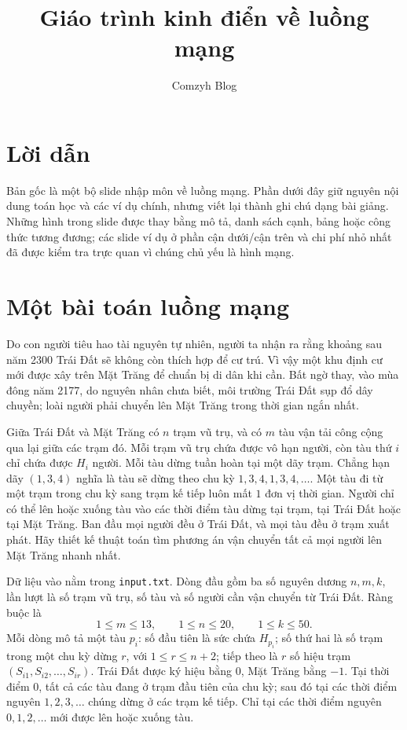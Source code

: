 \documentclass[11pt]{article}
\title{Giáo trình kinh điển về luồng mạng}
\author{Comzyh Blog}
\date{}
\begin{document}
\maketitle


\section*{Lời dẫn}

Bản gốc là một bộ slide nhập môn về luồng mạng. Phần dưới đây giữ nguyên nội
dung toán học và các ví dụ chính, nhưng viết lại thành ghi chú dạng bài giảng.
Những hình trong slide được thay bằng mô tả, danh sách cạnh, bảng hoặc công
thức tương đương; các slide ví dụ ở phần cận dưới/cận trên và chi phí nhỏ
nhất đã được kiểm tra trực quan vì chúng chủ yếu là hình mạng.

\section{Một bài toán luồng mạng}

Do con người tiêu hao tài nguyên tự nhiên, người ta nhận ra rằng khoảng sau năm
2300 Trái Đất sẽ không còn thích hợp để cư trú. Vì vậy một khu định cư mới được
xây trên Mặt Trăng để chuẩn bị di dân khi cần. Bất ngờ thay, vào mùa đông năm
2177, do nguyên nhân chưa biết, môi trường Trái Đất sụp đổ dây chuyền; loài
người phải chuyển lên Mặt Trăng trong thời gian ngắn nhất.

Giữa Trái Đất và Mặt Trăng có $n$ trạm vũ trụ, và có $m$ tàu vận tải công cộng
qua lại giữa các trạm đó. Mỗi trạm vũ trụ chứa được vô hạn người, còn tàu thứ
$i$ chỉ chứa được $H_i$ người. Mỗi tàu dừng tuần hoàn tại một dãy trạm. Chẳng
hạn dãy $(1,3,4)$ nghĩa là tàu sẽ dừng theo chu kỳ
$1,3,4,1,3,4,\ldots$. Một tàu đi từ một trạm trong chu kỳ sang trạm kế tiếp
luôn mất $1$ đơn vị thời gian. Người chỉ có thể lên hoặc xuống tàu vào các thời
điểm tàu dừng tại trạm, tại Trái Đất hoặc tại Mặt Trăng. Ban đầu mọi người đều
ở Trái Đất, và mọi tàu đều ở trạm xuất phát. Hãy thiết kế thuật toán tìm phương
án vận chuyển tất cả mọi người lên Mặt Trăng nhanh nhất.

Dữ liệu vào nằm trong \texttt{input.txt}. Dòng đầu gồm ba số nguyên dương
$n,m,k$, lần lượt là số trạm vũ trụ, số tàu và số người cần vận chuyển từ Trái
Đất. Ràng buộc là
\[
  1\le m\le 13,\qquad 1\le n\le 20,\qquad 1\le k\le 50.
\]
Mỗi dòng mô tả một tàu $p_i$: số đầu tiên là sức chứa $H_{p_i}$; số thứ hai là
số trạm trong một chu kỳ dừng $r$, với $1\le r\le n+2$; tiếp theo là
$r$ số hiệu trạm $(S_{i1},S_{i2},\ldots,S_{ir})$. Trái Đất được ký hiệu bằng
$0$, Mặt Trăng bằng $-1$. Tại thời điểm $0$, tất cả các tàu đang ở trạm đầu
tiên của chu kỳ; sau đó tại các thời điểm nguyên $1,2,3,\ldots$ chúng dừng ở
các trạm kế tiếp. Chỉ tại các thời điểm nguyên $0,1,2,\ldots$ mới được lên
hoặc xuống tàu.
\end{document}
